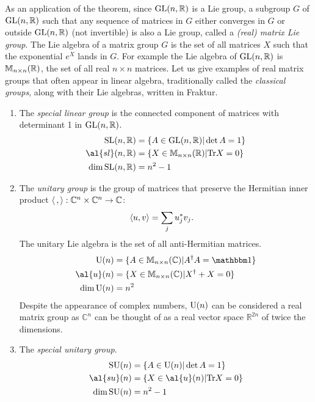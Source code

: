 As an application of the theorem, since $\text{GL}(n,\mathbb{R})$ is a Lie group, a subgroup $G$ of $\text{GL}(n,\mathbb{R})$ such that any sequence of matrices in $G$ either converges in $G$ or outside $\text{GL}(n,\mathbb{R})$ (not invertible) is also a Lie group, called a \emph{(real) matrix Lie group}. The Lie algebra of a matrix group $G$ is the set of all matrices $X$ such that the exponential $e^X$ lands in $G$. For example the Lie algebra of $\text{GL}(n,\mathbb{R})$ is $\mathbb{M}_{n \times n}(\mathbb{R})$, the set of all real $n \times n$ matrices. Let us give examples of real matrix groups that often appear in linear algebra, traditionally called the \emph{classical groups}, along with their Lie algebras, written in Fraktur.
\begin{enumerate}
	\item  The \emph{special linear group} is the connected component of matrices with determinant 1 in $\text{GL}(n,\mathbb{R})$.
	\begin{align}
	\gr{SL}{n,\mathbb{R}} &= \{ A \in \gr{GL}{n,\mathbb{R}} | \det A = 1 \} \\
	\al{sl}(n,\mathbb{R}) &= \{ X \in \mat{n}{n} | \Tr X = 0 \} \\
	\dim \gr{SL}{n,\mathbb{R}} &= n^2 - 1
	\end{align}
	
	\item The \emph{unitary group} is the group of matrices that preserve the Hermitian inner product $\braket{\, ,\,} :\mathbb{C}^{n} \times \mathbb{C}^{n} \to \mathbb{C}$:
	\begin{align}
		\braket{u,v} &= \sum_j u_j^* v_j.
	\end{align}
	The unitary Lie algebra is the set of all anti-Hermitian matrices.
	\begin{align}
	\gr{U}{n} &= \{ A \in \matc{n}{n} | A\dgg A = \id \} \\
	\al{u}(n) &= \{ X \in \matc{n}{n} | X\dgg  + X = 0 \} \\
	\dim \gr{U}{n} &= n^2
	\end{align}
	Despite the appearance of complex numbers, $\text{U}(n)$ can be considered a real matrix group as $\mathbb{C}^n$ can be thought of as a real vector space $\mathbb{R}^{2n}$ of twice the dimensions.
	
	\item The \emph{special unitary group}.
	\begin{align}
	\gr{SU}{n} &= \{ A \in \gr{U}{n} | \det A = 1 \} \\
	\al{su}(n) &= \{ X \in \al{u}(n) | \Tr X = 0 \} \\
	\dim \gr{SU}{n} &= n^2 - 1
	\end{align}
	

\end{enumerate}
